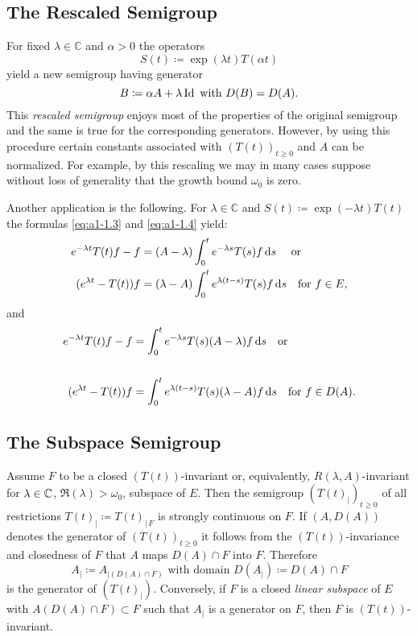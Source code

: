 \subsection{The Rescaled Semigroup}\label{subsec:a1-3.2}
For fixed $\lambda \in \mathbb{C}$ and $\alpha > 0$ the operators
\[
    S(t) \coloneqq \exp(\lambda t)T(\alpha t)
\]
yield a new semigroup having generator
\[
    B \coloneqq \alpha A + \lambda \operatorname{Id} \text{ with } D(B) = D(A) .
\]
This \emph{rescaled semigroup} enjoys most of the properties of the original semigroup and the same is true for the corresponding generators.
However, by using this procedure certain constants associated with $(T(t))_{t \geq 0}$ and $A$ can be normalized.
For example, by this rescaling we may in many cases suppose without loss of generality that the growth bound $\omega_{0}$ is zero.

Another application is the following.
For $\lambda \in \mathbb{C}$ and $S(t) \coloneqq \exp(-\lambda t)T(t)$ the formulas \eqref{eq:a1-1.3} and \eqref{eq:a1-1.4} yield:
\begin{align*}
    e^{-\lambda t}T(t)f - f &= (A-\lambda) \int_{0}^{t} e^{-\lambda s}T(s)f \ds \quad\text{ or }\notag \\
    (e^{\lambda t}-T(t))f &= (\lambda-A) \int_{0}^{t} e^{\lambda(t-s)}T(s)f \ds \quad \text{for } f \in E, %
\end{align*}
and
\begin{align*}
    e^{-\lambda t}T(t)f - f &= \int_{0}^{t} e^{-\lambda s}T(s)(A-\lambda)f \ds  \quad\text{or}\notag \\
    \notag \\
    (e^{\lambda t} - T(t))f &= \int_{0}^{t} e^{\lambda(t-s)}T(s)(\lambda-A)f \ds \quad \text{for } f \in D(A). %
\end{align*}
\subsection{The Subspace Semigroup}\label{subsec:a1-3.3}
Assume $F$ to be a closed $(T(t))$-invariant or, equivalently, $R(\lambda,A)$-invariant for 
$\lambda \in \mathbb{C}$, 
$ \Re(\lambda) > \omega_{0}$, subspace of $E$.
Then the semigroup $(T(t)_{|})_{t \geq 0}$ of all restrictions $T(t)_{|} \coloneqq T(t)_{|\,F}$ is strongly continuous on $F$.
If $(A,D(A))$ denotes the generator of $(T(t))_{t \geq 0}$ it follows from the $(T(t))$-invariance and closedness of $F$ that $A$ maps $D(A) \cap F$ into $F$.
Therefore
\[
    A_{|} \coloneqq A_{| (D(A)\cap F)} \text{ with domain } D(A_{|}) \coloneqq D(A) \cap F
\]
is the generator of $(T(t)_{|})$.
%
Conversely, if $F$ is a closed \emph{linear subspace} of $E$ with $A(D(A) \cap F) \subset F$ such that 
$A_{|}$ is a generator on $F$, then $F$ is $(T(t))$-invariant.

